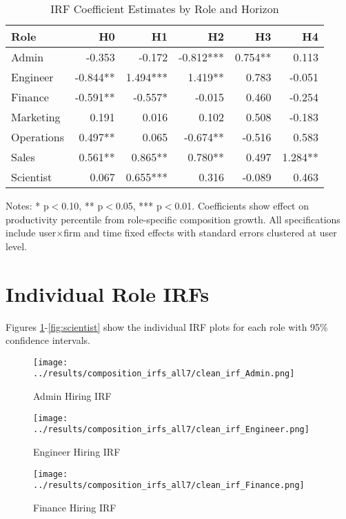 \documentclass[11pt]{article}
\begin{document}
\begin{table}[H]
\centering
\caption{IRF Coefficient Estimates by Role and Horizon}
\label{tab:results}
\begin{tabular}{lrrrrr}
\toprule
Role & H0 & H1 & H2 & H3 & H4 \\
\midrule
Admin & -0.353 & -0.172 & -0.812*** & 0.754** & 0.113 \\
Engineer & -0.844** & 1.494*** & 1.419** & 0.783 & -0.051 \\
Finance & -0.591** & -0.557* & -0.015 & 0.460 & -0.254 \\
Marketing & 0.191 & 0.016 & 0.102 & 0.508 & -0.183 \\
Operations & 0.497** & 0.065 & -0.674** & -0.516 & 0.583 \\
Sales & 0.561** & 0.865** & 0.780** & 0.497 & 1.284** \\
Scientist & 0.067 & 0.655*** & 0.316 & -0.089 & 0.463 \\
\bottomrule
\end{tabular}
\begin{minipage}{\textwidth}
\footnotesize
Notes: * p$<$0.10, ** p$<$0.05, *** p$<$0.01. Coefficients show effect on productivity percentile from role-specific composition growth. All specifications include user$\times$firm and time fixed effects with standard errors clustered at user level.
\end{minipage}
\end{table}

\section{Individual Role IRFs}

Figures \ref{fig:admin}-\ref{fig:scientist} show the individual IRF plots for each role with 95\% confidence intervals.

\begin{figure}[H]
\centering
\texttt{[image: ../results/composition\_irfs\_all7/clean\_irf\_Admin.png]}
\caption{Admin Hiring IRF}
\label{fig:admin}
\end{figure}

\begin{figure}[H]
\centering
\texttt{[image: ../results/composition\_irfs\_all7/clean\_irf\_Engineer.png]}
\caption{Engineer Hiring IRF}
\label{fig:engineer}
\end{figure}

\begin{figure}[H]
\centering
\texttt{[image: ../results/composition\_irfs\_all7/clean\_irf\_Finance.png]}
\caption{Finance Hiring IRF}
\label{fig:finance}
\end{figure}
\end{document}
